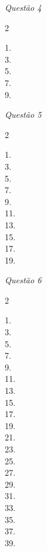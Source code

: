 \noindent\emph{Questão 4}
\begin{multicols}{2}
\begin{description}
	\item[1.] 
	\item[3.] 
	\item[5.] 
	\item[7.] 
	\item[9.] 
\end{description}
\end{multicols}

\noindent\emph{Questão 5}
\begin{multicols}{2}
\begin{description}
	\item[1.] 
	\item[3.] 
	\item[5.] 
	\item[7.] 
	\item[9.] 
	\item[11.] 
	\item[13.] 
	\item[15.] 
	\item[17.] 
	\item[19.] 
\end{description}
\end{multicols}

\noindent\emph{Questão 6}
\begin{multicols}{2}
\begin{description}
	\item[1.] 
	\item[3.] 
	\item[5.] 
	\item[7.] 
	\item[9.] 
	\item[11.] 
	\item[13.] 
	\item[15.] 
	\item[17.] 
	\item[19.] 
	\item[21.] 
	\item[23.] 
	\item[25.] 
	\item[27.] 
	\item[29.] 
	\item[31.] 
	\item[33.] 
	\item[35.] 
	\item[37.] 
	\item[39.] 
\end{description}
\end{multicols}
